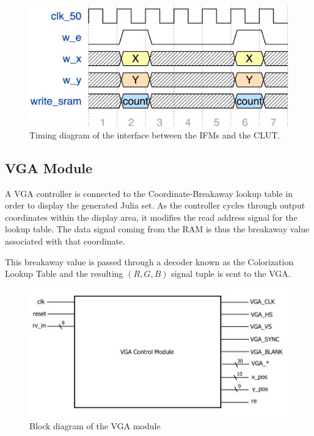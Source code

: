 \documentclass{article}
\begin{document}
\begin{figure}[h!]
  \centering
    \includegraphics[width=\textwidth]{timing_diagrams/ifm_clut.pdf}
  \caption{Timing diagram of the interface between the IFMs and the CLUT.}
\end{figure}




\subsection{VGA Module}

A VGA controller is connected to the Coordinate-Breakaway lookup table
in order to display the generated Julia set. As the controller cycles
through output coordinates within the display area, it modifies the
read address signal for the lookup table. The data signal coming from
the RAM is thus the breakaway value associated with that coordinate.

This breakaway value is passed through a decoder known as the
Colorization Lookup Table and the resulting $(R, G, B)$ signal tuple
is sent to the VGA.


\begin{figure}[h!]
  \centering
    \includegraphics[width=\textwidth]{block_diagrams/vga.pdf}
  \caption{Block diagram of the VGA module}
\end{figure}
\end{document}
